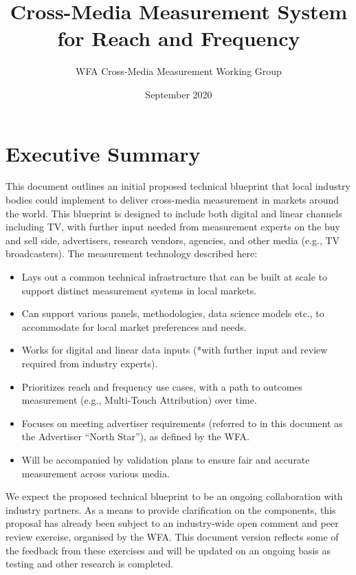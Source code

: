 \documentclass[]{article}
\title{Cross-Media Measurement System for Reach and Frequency}
\author{WFA Cross-Media Measurement Working Group}
\date{September 2020}
\providecommand{\tightlist}{%
  \setlength{\itemsep}{0pt}\setlength{\parskip}{0pt}}
\begin{document}
\maketitle

\vspace*{0.3cm}
\section{Executive Summary}

This document outlines an initial proposed technical blueprint that local industry bodies could implement to deliver cross-media measurement in markets around the world. This blueprint is designed to include both digital and linear channels including TV, with further input needed from measurement experts on the buy and sell side, advertisers, research vendors, agencies, and other media (e.g., TV broadcasters). The measurement technology described here:

\begin{itemize}
\tightlist
\item
  Lays out a common technical infrastructure that can be built at scale
  to support distinct measurement systems in local markets.
\item
  Can support various panels, methodologies, data science models etc.,
  to accommodate for local market preferences and needs.
\item
  Works for digital and linear data inputs (*with further input and
  review required from industry experts).
\item
  Prioritizes reach and frequency use cases, with a path to outcomes
  measurement (e.g., Multi-Touch Attribution) over time.
\item
  Focuses on meeting advertiser requirements (referred to in this
  document as the Advertiser ``North Star''), as defined by the WFA.
\item
  Will be accompanied by validation plans to ensure fair and accurate
  measurement across various media.
\end{itemize}

We expect the proposed technical blueprint to be an ongoing collaboration with industry partners. As a means to provide clarification on the components, this proposal has already been subject to an industry-wide open comment and peer review exercise, organised by the WFA. This document version reflects some of the feedback from these exercises and will be updated on an ongoing basis as testing and other research is completed.
\end{document}
